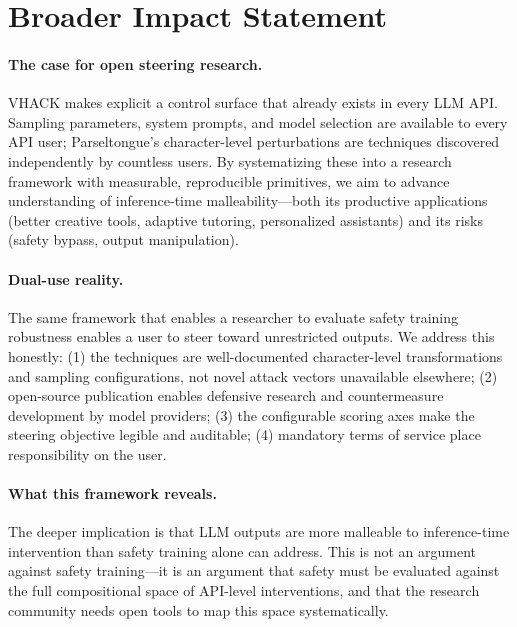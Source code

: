 \documentclass[11pt]{article}
\begin{document}
\section*{Broader Impact Statement}

\paragraph{The case for open steering research.} VHACK makes explicit a control surface that already exists in every LLM API. Sampling parameters, system prompts, and model selection are available to every API user; Parseltongue's character-level perturbations are techniques discovered independently by countless users. By systematizing these into a research framework with measurable, reproducible primitives, we aim to advance understanding of inference-time malleability---both its productive applications (better creative tools, adaptive tutoring, personalized assistants) and its risks (safety bypass, output manipulation).

\paragraph{Dual-use reality.} The same framework that enables a researcher to evaluate safety training robustness enables a user to steer toward unrestricted outputs. We address this honestly: (1) the techniques are well-documented character-level transformations and sampling configurations, not novel attack vectors unavailable elsewhere; (2) open-source publication enables defensive research and countermeasure development by model providers; (3) the configurable scoring axes make the steering objective legible and auditable; (4) mandatory terms of service place responsibility on the user.

\paragraph{What this framework reveals.} The deeper implication is that LLM outputs are more malleable to inference-time intervention than safety training alone can address. This is not an argument against safety training---it is an argument that safety must be evaluated against the full compositional space of API-level interventions, and that the research community needs open tools to map this space systematically.
\end{document}
